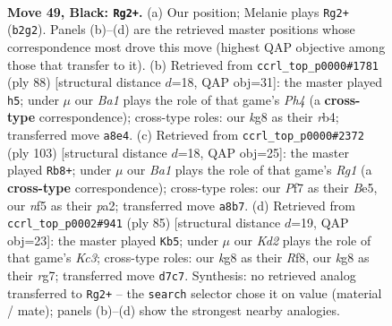 \documentclass[11pt]{article}
\begin{document}
\clearpage

\begin{figure}[p]\centering
\begin{subfigure}{0.46\textwidth}\centering
\resizebox{\linewidth}{!}{%
\newchessgame
\chessboard[
  setfen={b5K1/P2k1p1P/8/4PN2/8/R4p2/1r6/8 b - - 2 49},
  showmover=false,
  pgfstyle=straightmove, color=movearrow, markmove={b2-g2}
]}
\caption{}
\end{subfigure}\hfill
\begin{subfigure}{0.46\textwidth}\centering
\resizebox{\linewidth}{!}{%
\newchessgame
\chessboard[
  setfen={8/1pk5/4p3/p7/PrP4P/8/6K1/3R4 w - - 1 45},
  showmover=false,
  pgfstyle=straightmove, color=movearrow, markmove={h4-h5}
]}
\caption{}
\end{subfigure}
\\[4pt]
\begin{subfigure}{0.46\textwidth}\centering
\resizebox{\linewidth}{!}{%
\newchessgame
\chessboard[
  setfen={6r1/8/2P5/pK2bk2/7p/1P6/P4N2/4R3 b - - 0 52},
  showmover=false,
  pgfstyle=straightmove, color=movearrow, markmove={g8-b8}
]}
\caption{}
\end{subfigure}\hfill
\begin{subfigure}{0.46\textwidth}\centering
\resizebox{\linewidth}{!}{%
\newchessgame
\chessboard[
  setfen={5r2/5PR1/p1k3p1/4p3/8/8/4KP1P/8 b - - 1 43},
  showmover=false,
  pgfstyle=straightmove, color=movearrow, markmove={c6-b5}
]}
\caption{}
\end{subfigure}
\caption{\textbf{Move 49, Black: \texttt{Rg2+}.} (a) Our position; Melanie plays \texttt{Rg2+} (\texttt{b2g2}). Panels (b)--(d) are the retrieved master positions whose correspondence most drove this move (highest QAP objective among those that transfer to it). (b) Retrieved from \texttt{ccrl\_top\_p0000\#1781} (ply 88) [structural distance $d$=18, QAP obj=31]: the master played \texttt{h5}; under $\mu$ our \emph{Ba1} plays the role of that game's \emph{Ph4} (a \textbf{cross-type} correspondence); cross-type roles: our \emph{k}g8 as their \emph{r}b4; transferred move \texttt{a8e4}. (c) Retrieved from \texttt{ccrl\_top\_p0000\#2372} (ply 103) [structural distance $d$=18, QAP obj=25]: the master played \texttt{Rb8+}; under $\mu$ our \emph{Ba1} plays the role of that game's \emph{Rg1} (a \textbf{cross-type} correspondence); cross-type roles: our \emph{P}f7 as their \emph{B}e5, our \emph{n}f5 as their \emph{p}a2; transferred move \texttt{a8b7}. (d) Retrieved from \texttt{ccrl\_top\_p0002\#941} (ply 85) [structural distance $d$=19, QAP obj=23]: the master played \texttt{Kb5}; under $\mu$ our \emph{Kd2} plays the role of that game's \emph{Kc3}; cross-type roles: our \emph{k}g8 as their \emph{R}f8, our \emph{k}g8 as their \emph{r}g7; transferred move \texttt{d7c7}. Synthesis: no retrieved analog transferred to \texttt{Rg2+} -- the \texttt{search} selector chose it on value (material / mate); panels (b)--(d) show the strongest nearby analogies.}
\label{fig:thought-m97}
\end{figure}
\end{document}
